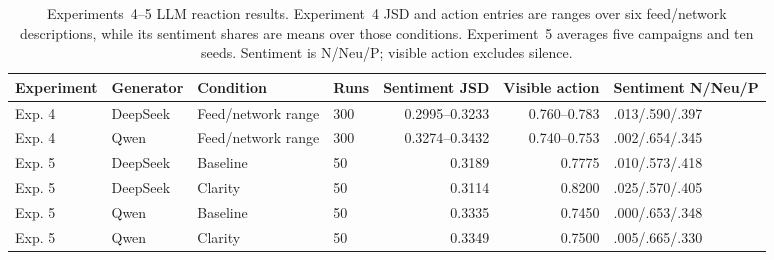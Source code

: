 \documentclass[conference]{IEEEtran}
\begin{document}
\begin{table}[t]
\caption{Experiments~4--5 LLM reaction results. Experiment~4 JSD and action
entries are ranges over six feed/network descriptions, while its sentiment
shares are means over those conditions. Experiment~5 averages five campaigns
and ten seeds. Sentiment is N/Neu/P; visible action excludes silence.}
\label{tab:exp45-results}
\centering
\footnotesize
\begin{tabular}{@{}llllrrl@{}}
\toprule
Experiment & Generator & Condition & Runs & Sentiment JSD &
Visible action & Sentiment N/Neu/P \\
\midrule
Exp. 4 & DeepSeek & Feed/network range & 300 & 0.2995--0.3233 &
0.760--0.783 & .013/.590/.397 \\
Exp. 4 & Qwen & Feed/network range & 300 & 0.3274--0.3432 &
0.740--0.753 & .002/.654/.345 \\
Exp. 5 & DeepSeek & Baseline & 50 & 0.3189 & 0.7775 & .010/.573/.418 \\
Exp. 5 & DeepSeek & Clarity & 50 & 0.3114 & 0.8200 & .025/.570/.405 \\
Exp. 5 & Qwen & Baseline & 50 & 0.3335 & 0.7450 & .000/.653/.348 \\
Exp. 5 & Qwen & Clarity & 50 & 0.3349 & 0.7500 & .005/.665/.330 \\
\bottomrule
\end{tabular}
\end{table}
\end{document}
